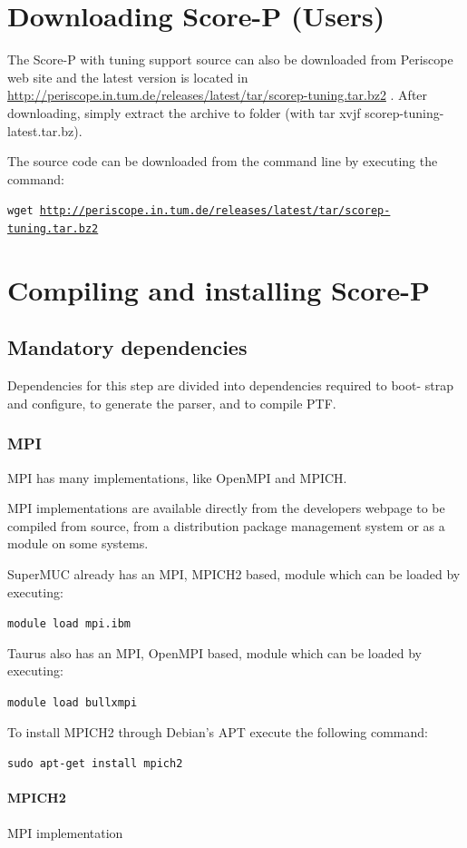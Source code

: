 \documentclass[11pt,a4paper, oneside]{book} %
\newcommand{\scoreptarball}{\url{http://periscope.in.tum.de/releases/latest/tar/scorep-tuning.tar.bz2} }
\begin{document}
\section {Downloading Score-P (Users)}

The Score-P with tuning support source can also be downloaded from Periscope web
site and the latest version is located in \scoreptarball. After downloading,
simply extract the archive to folder (with tar xvjf scorep-tuning-latest.tar.bz).

The source code can be downloaded from the command line by executing the
command:

\texttt{wget \scoreptarball}

\section{Compiling and installing Score-P}

\subsection{Mandatory dependencies}

Dependencies for this step are divided into dependencies required to boot-
strap and configure, to generate the parser, and to compile PTF.



\subsubsection{MPI}

MPI has many implementations, like OpenMPI and MPICH.

MPI implementations are available directly from the developers webpage to be
compiled from source, from a distribution package management system or as a
module on some systems.

SuperMUC already has an MPI, MPICH2 based, module which can be loaded by
executing:

\texttt{module load mpi.ibm}

Taurus also has an MPI, OpenMPI based, module which can be loaded by executing:

\texttt{module load bullxmpi}

To install MPICH2 through Debian's APT execute the following command:

\texttt{sudo apt-get install mpich2}

\paragraph{MPICH2} MPI implementation
\end{document}
